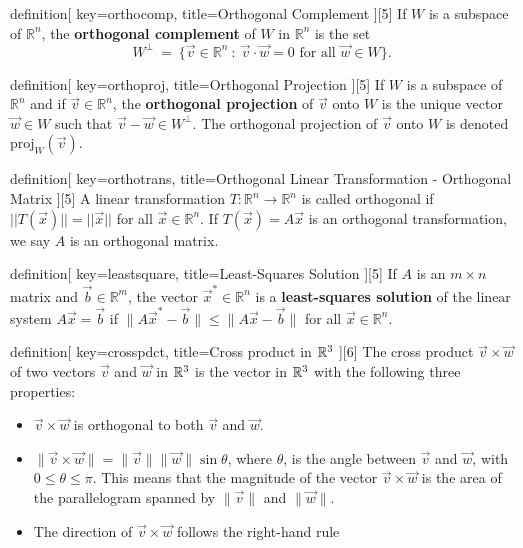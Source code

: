 \begin{SaveConcept}{definition}[
		key=orthocomp,
		title={Orthogonal Complement}
	][5]
	If $W$ is a subspace of $\mathbb R^n$, the {\bf orthogonal complement} of $W$ in $\mathbb R^n$ is the set
	$$
	W^\bot \ = \ \{\vec{v}\in \mathbb R^n \::\: \vec{v}\cdot \vec{w}=0\text{ for all $\vec{w}\in W$}\}.
	$$
\end{SaveConcept}


\begin{SaveConcept}{definition}[
		key=orthoproj,
		title={Orthogonal Projection}
	][5]
        If $W$ is a subspace of $\mathbb R^n$ and if $\vec{v}\in \mathbb R^n$, the {\bf orthogonal projection} of $\vec{v}$ onto $W$ is the unique vector $\vec{w}\in W$ such that $\vec{v}-\vec{w}\in W^\bot$. The orthogonal projection of $\vec{v}$ onto $W$ is  denoted $\text{proj}_W(\vec{v})$.
\end{SaveConcept}

\begin{SaveConcept}{definition}[
		key=orthotrans,
		title={Orthogonal Linear Transformation - Orthogonal Matrix}
	][5]
            A linear transformation $T: \mathbb{R}^n\rightarrow\mathbb{R}^n$ is called orthogonal if $||T(\vec x)||=||\vec x||$ for all $\vec x\in\mathbb{R}^n.$ If $T(\vec x)=A\vec x$ is an orthogonal transformation, we say $A$ is an orthogonal matrix.
\end{SaveConcept}


\begin{SaveConcept}{definition}[
		key=leastsquare,
		title={Least-Squares Solution}
	][5]
        If $A$ is an $m\times n$ matrix and $\vec{b}\in\mathbb R^m$, the vector $\vec{x}^*\in\mathbb R^n$ is a {\bf least-squares solution} of the linear system $A\vec{x}=\vec{b}$ if $\|A\vec{x}^*-\vec{b}\|\leq\|A\vec{x}-\vec{b}\|$ for all $\vec{x}\in\mathbb R^n$.
\end{SaveConcept}


\begin{SaveConcept}{definition}[
		key=crosspdct,
		title={Cross product in $\mathbb{R}^3$}
	][6]
        The cross product $\vec v \times  \vec w$ of two vectors $\vec v$ and $\vec w$ in $\mathbb{R}^3$ is the vector in $\mathbb{R}^3$ with the following three properties:
        \begin{itemize}
            \item $\vec v \times  \vec w$ is orthogonal to both $\vec v$ and $\vec w$.
            \item $\|\vec v\times \vec w\|=\|\vec v\|\|\vec w\|\sin \theta$, where $\theta$, is the angle between $\vec v$ and $\vec w$, with $0 \leq  \theta \leq \pi$. This means that the magnitude of the vector $\vec v\times \vec w$ is the area of the parallelogram spanned by $\|\vec v\|$ and $\|\vec w\|$. 
            \item The direction of $\vec v\times \vec w$ follows the right-hand rule
        \end{itemize}
\end{SaveConcept}


